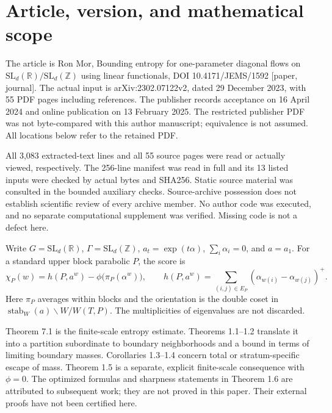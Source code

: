 \documentclass[10pt]{article}
\begin{document}
\section*{Article, version, and mathematical scope}
The article is Ron Mor, Bounding entropy for one-parameter diagonal flows on \(\mathrm{SL}_d(\mathbb R)/\mathrm{SL}_d(\mathbb Z)\) using linear functionals, DOI 10.4171/JEMS/1592 [paper, journal]. The actual input is arXiv:2302.07122v2, dated 29 December 2023, with 55 PDF pages including references. The publisher records acceptance on 16 April 2024 and online publication on 13 February 2025. The restricted publisher PDF was not byte-compared with this author manuscript; equivalence is not assumed. All locations below refer to the retained PDF.\par
All 3,083 extracted-text lines and all 55 source pages were read or actually viewed, respectively. The 256-line manifest was read in full and its 13 listed inputs were checked by actual bytes and SHA256. Static source material was consulted in the bounded auxiliary checks. Source-archive possession does not establish scientific review of every archive member. No author code was executed, and no separate computational supplement was verified. Missing code is not a defect here.\par
Write \(G=\mathrm{SL}_d(\mathbb R)\), \(\Gamma=\mathrm{SL}_d(\mathbb Z)\), \(a_t=\exp(t\alpha)\), \(\sum_i\alpha_i=0\), and \(a=a_1\). For a standard upper block parabolic \(P\), the score is \[\chi_P(w)=h(P,a^w)-\phi\bigl(\pi_P(\alpha^w)\bigr),
 \qquad
 h(P,a^w)=\sum_{(i,j)\in E_P}
                   (\alpha_{w(i)}-\alpha_{w(j)})^+.\] Here \(\pi_P\) averages within blocks and the orientation is the double coset in \(\operatorname{stab}_W(a)\backslash W/W(T,P)\). The multiplicities of eigenvalues are not discarded.\par
Theorem 7.1 is the finite-scale entropy estimate. Theorems 1.1–1.2 translate it into a partition subordinate to boundary neighborhoods and a bound in terms of limiting boundary masses. Corollaries 1.3–1.4 concern total or stratum-specific escape of mass. Theorem 1.5 is a separate, explicit finite-scale consequence with \(\phi=0\). The optimized formulas and sharpness statements in Theorem 1.6 are attributed to subsequent work; they are not proved in this paper. Their external proofs have not been certified here.\par
\end{document}
